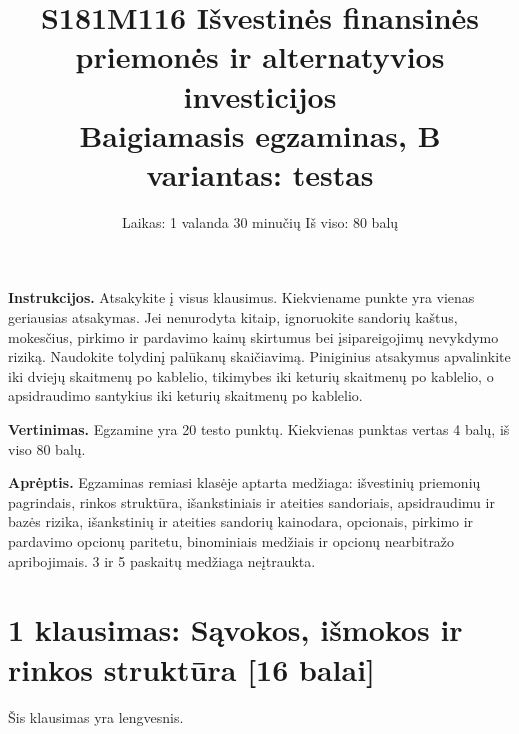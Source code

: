 \documentclass[11pt]{article}
\title{S181M116 Išvestinės finansinės priemonės ir alternatyvios investicijos\\
Baigiamasis egzaminas, B variantas: testas}
\author{Laikas: 1 valanda 30 minučių \qquad Iš viso: 80 balų}
\date{}
\newcommand{\pts}[1]{\hspace{0.35em}\textnormal{\textbf{[#1 balai]}}}
\begin{document}
\maketitle

\textbf{Instrukcijos.} Atsakykite į visus klausimus. Kiekviename punkte yra
vienas geriausias atsakymas. Jei nenurodyta kitaip, ignoruokite sandorių kaštus,
mokesčius, pirkimo ir pardavimo kainų skirtumus bei įsipareigojimų nevykdymo
riziką. Naudokite tolydinį palūkanų skaičiavimą. Piniginius atsakymus
apvalinkite iki dviejų skaitmenų po kablelio, tikimybes iki keturių skaitmenų po
kablelio, o apsidraudimo santykius iki keturių skaitmenų po kablelio.

\textbf{Vertinimas.} Egzamine yra 20 testo punktų. Kiekvienas punktas vertas 4
balų, iš viso 80 balų.

\textbf{Aprėptis.} Egzaminas remiasi klasėje aptarta medžiaga: išvestinių
priemonių pagrindais, rinkos struktūra, išankstiniais ir ateities sandoriais,
apsidraudimu ir bazės rizika, išankstinių ir ateities sandorių kainodara,
opcionais, pirkimo ir pardavimo opcionų paritetu, binominiais medžiais ir
opcionų nearbitražo apribojimais. 3 ir 5 paskaitų medžiaga neįtraukta.

\section*{1 klausimas: Sąvokos, išmokos ir rinkos struktūra \pts{16}}

Šis klausimas yra lengvesnis.
\end{document}
